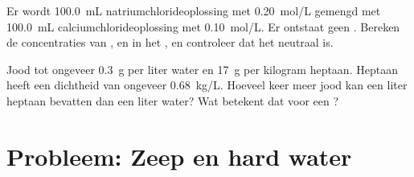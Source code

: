 \begin{exercise}[$\star\star\star$]\label{exo:g11:dissolution:14}
Er wordt \qty{100.0}{mL} natriumchlorideoplossing met \qty{0.20}{mol/L}
gemengd met \qty{100.0}{mL} calciumchlorideoplossing met
\qty{0.10}{mol/L}. Er ontstaat geen . Bereken de concentraties
van ,  en  in het , en controleer dat
het neutraal is.
\end{exercise}

\begin{exercise}[$\star\star\star$]\label{exo:g11:dissolution:15}
Jood  tot ongeveer \qty{0.3}{g} per liter water en \qty{17}{g} per
kilogram heptaan. Heptaan heeft een dichtheid van ongeveer
\qty{0.68}{kg/L}. Hoeveel keer meer jood kan een liter heptaan bevatten
dan een liter water? Wat betekent dat voor een ?
\end{exercise}

\section{Probleem: Zeep en hard water}

